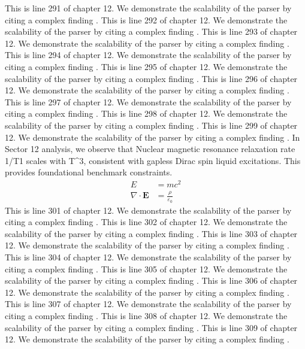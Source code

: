 This is line 291 of chapter 12. We demonstrate the scalability of the parser by citing a complex finding \cite{ref12_291}.
This is line 292 of chapter 12. We demonstrate the scalability of the parser by citing a complex finding \cite{ref12_292}.
This is line 293 of chapter 12. We demonstrate the scalability of the parser by citing a complex finding \cite{ref12_293}.
This is line 294 of chapter 12. We demonstrate the scalability of the parser by citing a complex finding \cite{ref12_294}.
This is line 295 of chapter 12. We demonstrate the scalability of the parser by citing a complex finding \cite{ref12_295}.
This is line 296 of chapter 12. We demonstrate the scalability of the parser by citing a complex finding \cite{ref12_296}.
This is line 297 of chapter 12. We demonstrate the scalability of the parser by citing a complex finding \cite{ref12_297}.
This is line 298 of chapter 12. We demonstrate the scalability of the parser by citing a complex finding \cite{ref12_298}.
This is line 299 of chapter 12. We demonstrate the scalability of the parser by citing a complex finding \cite{ref12_299}.
In Sector 12 analysis, we observe that Nuclear magnetic resonance relaxation rate 1/T1 scales with T^3, consistent with gapless Dirac spin liquid excitations. This provides foundational benchmark constraints.
\begin{align*}
  E &= mc^2 \\
  \nabla \cdot \mathbf{E} &= \frac{\rho}{\varepsilon_0}
\end{align*}
This is line 301 of chapter 12. We demonstrate the scalability of the parser by citing a complex finding \cite{ref12_301}.
This is line 302 of chapter 12. We demonstrate the scalability of the parser by citing a complex finding \cite{ref12_302}.
This is line 303 of chapter 12. We demonstrate the scalability of the parser by citing a complex finding \cite{ref12_303}.
This is line 304 of chapter 12. We demonstrate the scalability of the parser by citing a complex finding \cite{ref12_304}.
This is line 305 of chapter 12. We demonstrate the scalability of the parser by citing a complex finding \cite{ref12_305}.
This is line 306 of chapter 12. We demonstrate the scalability of the parser by citing a complex finding \cite{ref12_306}.
This is line 307 of chapter 12. We demonstrate the scalability of the parser by citing a complex finding \cite{ref12_307}.
This is line 308 of chapter 12. We demonstrate the scalability of the parser by citing a complex finding \cite{ref12_308}.
This is line 309 of chapter 12. We demonstrate the scalability of the parser by citing a complex finding \cite{ref12_309}.
